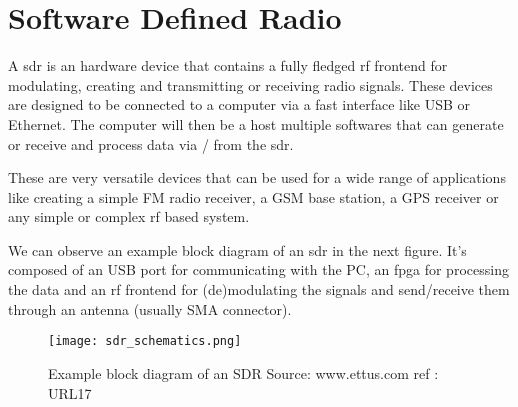 \section{Software Defined Radio}

A \gls{sdr} is an hardware device that contains a fully fledged \gls{rf} frontend for modulating, creating and transmitting or receiving radio signals. These devices are designed to be connected to a computer via a fast interface like USB or Ethernet. The computer will then be a host multiple softwares that can generate or receive and process data via / from the \gls{sdr}.

These are very versatile devices that can be used for a wide range of applications like creating a simple FM radio receiver, a GSM base station, a GPS receiver or any simple or complex \gls{rf} based system.

We can observe an example block diagram of an \gls{sdr} in the next figure. It's composed of an USB port for communicating with the PC, an \gls{fpga} for processing the data and an \gls{rf} frontend for (de)modulating the signals and send/receive them through an antenna (usually SMA connector).

\begin{figure}[H]
	\centering
	\texttt{[image: sdr\_schematics.png]}
	\caption[Example block diagram of an SDR]{Example block diagram of an SDR Source: www.ettus.com ref : URL17}
	\label{fig:sdr_schematics}
\end{figure}






